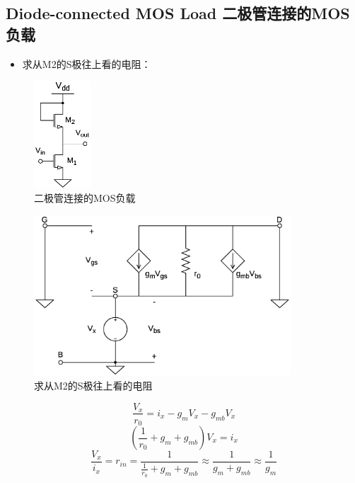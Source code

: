 \documentclass[twoside,a4paper,openright,titlepage,draft]{ctexrep}
\begin{document}
\subsection{Diode-connected MOS Load 二极管连接的MOS负载}
\vspace*{1em}
\begin{multicols}{2}
    \begin{itemize}
        \item 求从M2的S极往上看的电阻：
    \end{itemize}
    \columnbreak
    \begin{figure}[H]
        \centering
        \includegraphics[height=40mm]{diode-connectedload.eps}
        \caption{二极管连接的MOS负载}
        \label{fig:二级管连接的MOS负载}
    \end{figure}
\end{multicols}

\begin{figure}[H]
    \centering
    \includegraphics[height=60mm]{sourceimpedence.eps}
    \caption{求从M2的S极往上看的电阻}
    \label{fig:求从M2的S极往上看的电阻}
\end{figure}        

\begin{equation}
    \frac{V_x}{r_0} = i_x - g_mV_x - g_{mb}V_x
\end{equation}
\begin{equation}
    (\frac{1}{r_0} + g_m + g_{mb})V_x = i_x
\end{equation}
\begin{equation}
    \frac{V_x}{i_x} = r_{in} = \frac{1}{\frac{1}{r_0} + g_m + g_{mb}}
    \approx \frac{1}{g_m + g_{mb}} \approx \frac{1}{g_m}
\end{equation}
\end{document}
